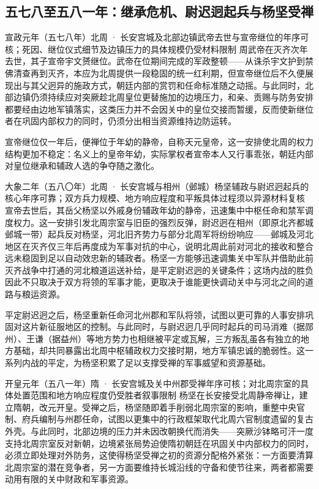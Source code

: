 \subsection{五七八至五八一年：继承危机、尉迟迥起兵与杨坚受禅}

\begin{event}{}{宣政元年（五七八年）}{北周 · 长安宫城及北部边镇}{武帝去世与宣帝继位的年序可核；死因、继位仪式细节及边镇压力的具体规模仍受材料限制}
周武帝在灭齐次年去世，其子宣帝宇文赟继位。武帝在位期间完成的军政整顿——从诛杀宇文护到禁佛清查再到灭齐，本应为北周提供一段稳固的统一红利期，但宣帝继位后不久便展现出与其父迥异的施政方式，朝廷内部的赏罚和任命标准随之动摇。与此同时，北部边镇仍须持续应对突厥趁北周皇位更替施加的边境压力，和亲、贡赐与防务安排都要经由边地军镇落实，这类压力并不会因关中的皇位交接而暂缓，反而使新继位者在巩固内部权力的同时，仍须分出相当资源维持边防运转。
\end{event}

宣帝继位仅一年后，便禅位于年幼的静帝，自称天元皇帝，这一安排使北周的权力结构更加不稳定：名义上的皇帝年幼，实际掌权者宣帝本人又行事乖张，朝廷内部对皇位继承和辅政人选的争夺随之激化。

\begin{event}{}{大象二年（五八〇年）}{北周 · 长安宫城与相州（邺城）}{杨坚辅政与尉迟迥起兵的核心年序可靠；双方兵力规模、地方响应程度和平叛具体过程须以异源材料复核}
宣帝去世后，其岳父杨坚以外戚身份辅政年幼的静帝，迅速集中中枢任命和禁军调度权力。这一安排引发北周宗室与旧臣的强烈反弹，尉迟迥在相州（即原北齐都城邺城一带）起兵反对杨坚，河北旧齐势力与部分北周军将纷纷响应——邺城及河北地区在灭齐仅三年后再度成为军事对抗的中心，说明北周此前对河北的接收和整合远未稳固到足以自动效忠新的辅政者。杨坚一方能够迅速调集关中军队并借助此前灭齐战争中打通的河北粮道运送补给，是平定尉迟迥的关键条件；这场内战的胜负因此不只取决于双方将领的军事才能，更取决于谁能更快调动关中与河北之间的道路与粮运资源。
\end{event}

平定尉迟迥之后，杨坚重新任命河北州郡和军队将领，试图以更可靠的人事安排巩固对这片新征服地区的控制。与此同时，与尉迟迥几乎同时起兵的司马消难（据郧州）、王谦（据益州）等地方势力也相继被平定或瓦解，三方叛乱虽各有独立的地方基础，却共同暴露出北周中枢辅政权力交接时期，地方军镇忠诚的脆弱性。这一系列内战的平定，为杨坚积累了足以支撑受禅的军事威望和资源基础。

\begin{event}{}{开皇元年（五八一年）}{隋 · 长安宫城及关中州郡}{受禅年序可核；对北周宗室的具体处置范围和地方响应程度仍受胜者叙事限制}
杨坚在长安接受北周静帝禅让，建立隋朝，改元开皇。受禅之后，杨坚随即着手削弱北周宗室的影响，重整中央官制、府兵编制与州郡任命，试图以更集中的行政框架取代北周六官制度遗留的复古外壳。与此同时，北部边境的压力并未因改朝换代而消失——突厥沙钵略可汗一度支持北周宗室反对新朝，边境紧张局势迫使隋初朝廷在巩固关中内部权力的同时，必须立即处理对外防务，这使得杨坚受禅之初的资源分配格外紧张：一方面要清算北周宗室的潜在竞争者，另一方面要维持长城沿线的守备和使节往来，两者都需要动用有限的关中财政和军事资源。
\end{event}

